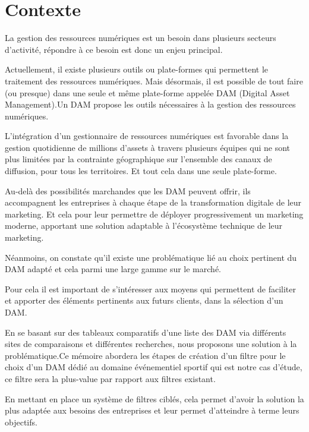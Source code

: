 \chapter{Contexte}
La gestion des ressources numériques est un besoin dans plusieurs secteurs d’activité, répondre à ce besoin est donc un enjeu principal.
\newline

Actuellement, il existe plusieurs outils ou plate-formes qui permettent le traitement des ressources numériques. Mais désormais, il est possible de tout faire (ou presque) dans une seule et même plate-forme appelée DAM (Digital Asset Management).Un DAM propose les outils nécessaires à la gestion des ressources numériques.
\newline

L’intégration d’un gestionnaire de ressources numériques est favorable dans la gestion quotidienne de millions d’assets à travers plusieurs équipes qui ne sont plus limitées par la contrainte géographique sur l’ensemble des canaux de diffusion, pour tous les territoires. Et tout cela dans une seule plate-forme.
\newline

Au-delà des possibilités marchandes que les DAM peuvent offrir, ils accompagnent les entreprises à chaque étape de la transformation digitale de leur marketing.
Et cela pour leur permettre de déployer progressivement un marketing moderne, apportant une solution adaptable à l’écosystème technique de leur marketing.
\newline

Néanmoins, on constate qu’il existe une problématique lié au choix pertinent du DAM adapté et cela parmi une large gamme sur le marché.
\newline

Pour cela il est important de s'intéresser aux moyens qui permettent de faciliter et apporter des éléments pertinents aux futurs clients, dans la sélection d’un DAM. 
\newline

En se basant sur des tableaux comparatifs d’une liste des DAM  via différents sites de comparaisons et différentes recherches, nous proposons une solution à la problématique.Ce mémoire abordera les étapes de création d’un filtre pour le choix d’un DAM dédié au domaine événementiel sportif qui est notre cas d’étude, ce filtre sera la plus-value par rapport aux filtres existant.
\newline

En mettant en place un système de filtres ciblés, cela permet d’avoir la solution la plus adaptée aux besoins des entreprises et leur permet d’atteindre à terme leurs objectifs. 
\newline


